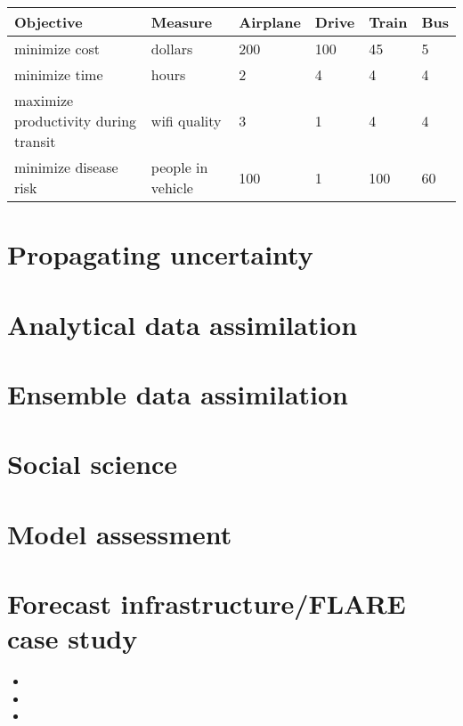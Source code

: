 \documentclass[12pt, oneside]{article}   	%
\begin{document}
\begin{table}[h!]
\begin{tabular}{|l|l|l|l|l|l|}
\hline
Objective & Measure & Airplane & Drive & Train & Bus \\ \hline
minimize cost & dollars  & 200  & 100 & 45 & 5  \\ \hline
minimize time & hours & 2 & 4 & 4 & 4 \\ \hline
maximize productivity during transit & wifi quality & 3  & 1 & 4 & 4 \\ \hline
minimize disease risk & people in vehicle  & 100  & 1  & 100  & 60 \\ \hline
\end{tabular}
\end{table}

\section{Propagating uncertainty}

\section{Analytical data assimilation}

\section{Ensemble data assimilation}

\section{Social science}

\section{Model assessment}

\section{Forecast infrastructure/FLARE case study}


\begin{itemize}
\item 

\item 

\item 

\end{itemize}
\end{document}
